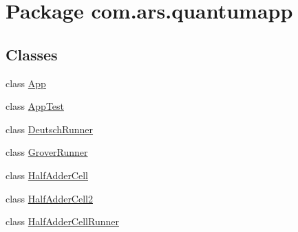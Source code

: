 \hypertarget{namespacecom_1_1ars_1_1quantumapp}{}\section{Package com.\+ars.\+quantumapp}
\label{namespacecom_1_1ars_1_1quantumapp}
\subsection*{Classes}
\begin{DoxyCompactItemize}
\item 
class \hyperlink{classcom_1_1ars_1_1quantumapp_1_1_app}{App}
\item 
class \hyperlink{classcom_1_1ars_1_1quantumapp_1_1_app_test}{App\+Test}
\item 
class \hyperlink{classcom_1_1ars_1_1quantumapp_1_1_deutsch_runner}{Deutsch\+Runner}
\item 
class \hyperlink{classcom_1_1ars_1_1quantumapp_1_1_grover_runner}{Grover\+Runner}
\item 
class \hyperlink{classcom_1_1ars_1_1quantumapp_1_1_half_adder_cell}{Half\+Adder\+Cell}
\item 
class \hyperlink{classcom_1_1ars_1_1quantumapp_1_1_half_adder_cell2}{Half\+Adder\+Cell2}
\item 
class \hyperlink{classcom_1_1ars_1_1quantumapp_1_1_half_adder_cell_runner}{Half\+Adder\+Cell\+Runner}
\end{DoxyCompactItemize}
